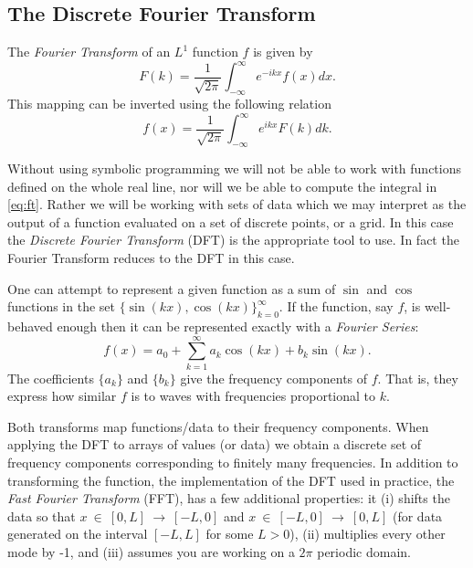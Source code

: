 \documentclass[fleqn,10pt]{SelfArx} %
\begin{document}
\subsection{The Discrete Fourier Transform}
\label{sec:dft}
The \textit{Fourier Transform} of an $L^1$ function $f$ is given by
\begin{equation}\label{eq:ft}
F(k) = \frac{1}{\sqrt{2\pi}}\int^\infty_{-\infty}e^{-ikx}f(x)dx.
\end{equation}
This mapping can be inverted using the following relation
\begin{equation}
f(x) = \frac{1}{\sqrt{2\pi}}\int^\infty_{-\infty}e^{ikx}F(k)dk.
\end{equation}

\noindent
Without using symbolic programming we will not be able to work with functions defined on the whole real line, nor will we be able to compute the integral in \ref{eq:ft}. Rather we will be working with sets of data which we may interpret as the output of a function evaluated on a set of discrete points, or a grid. In this case the \textit{Discrete Fourier Transform} (DFT) is the appropriate tool to use. In fact the Fourier Transform reduces to the DFT in this case. 

One can attempt to represent a given function as a sum of $\sin$ and $\cos$ functions in the set $\{\sin(kx),\cos(kx)\}_{k=0}^\infty$. If the function, say $f$, is well-behaved enough then it can be represented exactly with a \textit{Fourier Series}:
\begin{equation}\label{eq:fs}
	f(x) = a_0 + \sum^\infty_{k=1}a_k\cos(kx)+b_k\sin(kx).
\end{equation} 
The coefficients $\{a_k\}$ and $\{b_k\}$ give the frequency components of $f$. That is, they express how similar $f$ is to waves with frequencies proportional to $k$.

Both transforms map functions/data to their frequency components. When applying the DFT to  arrays of values (or data) we obtain a discrete set of frequency components corresponding to finitely many frequencies. In addition to transforming the function, the implementation of the DFT used in practice, the \textit{Fast Fourier Transform} (FFT), has a few additional properties: it (i) shifts the data so that $x~\in~[0,L]~\rightarrow~[-L,0]$ and $x~\in~[-L,0]~\rightarrow~[0,L]$ (for data generated on the interval $[-L,L]$ for some $L>0$), (ii) multiplies every other mode by -1, and (iii) assumes you are working on a $2\pi$ periodic domain.
\end{document}
